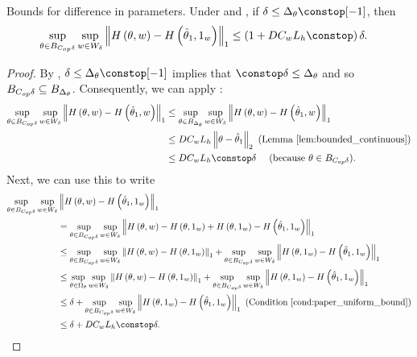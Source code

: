 \begin{lem}
\label{lem:gh_difference_from_one}Bounds for difference in parameters.
Under \paperallcoreassum and , if $\delta\le\thetasize\constop[-1]$,
then
\begin{align*}
\sup_{\theta\in\thetadeltaball}\sup_{w\in W_{\delta}} & \norm{H\left(\theta,w\right)-H\left(\thetaone,\onevec\right)}_{1}\le\left(1+D\constw\liph\constop\right)\delta.
\end{align*}
\end{lem}
\begin{proof}
By , $\delta\le\thetasize\constop[-1]$
implies that $\constop\delta\le\thetasize$ and so $B_{C_{op}\delta}\subseteq B_{\Delta_{\theta}}$.
Consequently, we can apply :
\begin{align*}
\sup_{\theta\in\thetadeltaball}\sup_{w\in W_{\delta}}\norm{H\left(\theta,w\right)-H\left(\thetaone,w\right)}_{1} & \le\sup_{\theta\in\thetaball}\sup_{w\in W_{\delta}}\norm{H\left(\theta,w\right)-H\left(\thetaone,w\right)}_{1}\\
 & \le D\constw\liph\norm{\theta-\thetaone}_{2}\textrm{ (Lemma \ref{lem:bounded_continuous})}\\
 & \le D\constw\liph\constop\delta\quad\textrm{ (because }\theta\in\thetadeltaball\textrm{)}.
\end{align*}
%
Next, we can use this to write
\begin{align*}
\sup_{\theta\in\thetadeltaball}\sup_{w\in W_{\delta}} & \norm{H\left(\theta,w\right)-H\left(\thetaone,\onevec\right)}_{1}\\
 & =\sup_{\theta\in\thetadeltaball}\sup_{w\in W_{\delta}}\norm{H\left(\theta,w\right)-H\left(\theta,\onevec\right)+H\left(\theta,\onevec\right)-H\left(\thetaone,\onevec\right)}_{1}\\
 & \le\sup_{\theta\in\thetadeltaball}\sup_{w\in W_{\delta}}\norm{H\left(\theta,w\right)-H\left(\theta,\onevec\right)}_{1}+\sup_{\theta\in\thetadeltaball}\sup_{w\in W_{\delta}}\norm{H\left(\theta,\onevec\right)-H\left(\thetaone,\onevec\right)}_{1}\\
 & \le\sup_{\theta\in\Omega_{\theta}}\sup_{w\in W_{\delta}}\norm{H\left(\theta,w\right)-H\left(\theta,\onevec\right)}_{1}+\sup_{\theta\in\thetadeltaball}\sup_{w\in W_{\delta}}\norm{H\left(\theta,\onevec\right)-H\left(\thetaone,\onevec\right)}_{1}\\
 & \le\delta+\sup_{\theta\in\thetadeltaball}\sup_{w\in W_{\delta}}\norm{H\left(\theta,\onevec\right)-H\left(\thetaone,\onevec\right)}_{1}\textrm{ (Condition \ref{cond:paper_uniform_bound})}\\
 & \le\delta+D\constw\liph\constop\delta.
\end{align*}
\end{proof}

